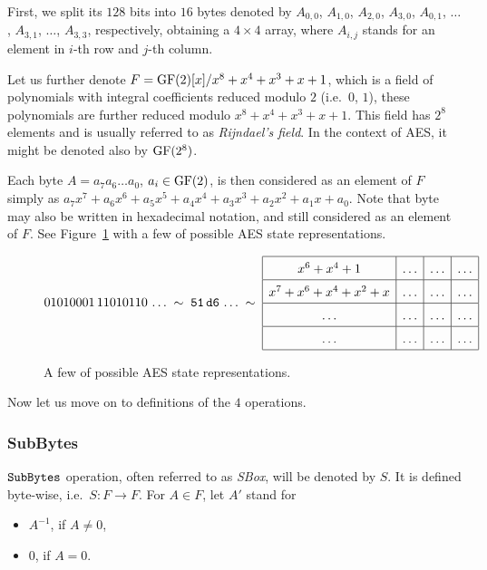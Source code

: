 First, we split its $128$ bits into $16$ bytes denoted by $A_{0,0}$, $A_{1,0}$, $A_{2,0}$, $A_{3,0}$, $A_{0,1}$, $\ldots$, $A_{3,1}$, $\ldots$, $A_{3,3}$, respectively, obtaining a $4\times 4$ array, where $A_{i,j}$ stands for an element in $i$-th row and $j$-th column.

Let us further denote $F = \mathrm{GF}(2)[x]/x^8+x^4+x^3+x+1$, which is a field of polynomials with integral coefficients reduced modulo $2$ (i.e.\ $0$, $1$), these polynomials are further reduced modulo $x^8+x^4+x^3+x+1$. This field has $2^8$ elements and is usually referred to as {\em Rijndael's field}. In the context of AES, it might be denoted also by $\mathrm{GF}(2^8)$.


Each byte $A = a_7a_6\ldots a_0$, $a_i\in\mathrm{GF}(2)$, is then considered as an element of $F$ simply as $a_7x^7 + a_6x^6 + a_5x^5 + a_4x^4 + a_3x^3 + a_2x^2 + a_1x + a_0$.  Note that byte may also be written in hexadecimal notation, and still considered as an element of $F$. See Figure~\ref{fig:aesnot} with a few of possible AES state representations.

\begin{figure}[H]
\[
\arraycolsep=.5em\def\arraystretch{1.5}
	01010001\,11010110\,\ldots\;\sim\;\texttt{51}\,\texttt{d6}\,\ldots\;\sim\;
	\begin{array}{|c|c|c|c|}
		\hline
		x^6 + x^4 + 1 & \ldots & \ldots & \ldots \\
		\hline
		x^7 + x^6 + x^4 + x^2 + x & \ldots & \ldots & \ldots \\
		\hline
		\ldots & \ldots & \ldots & \ldots \\
		\hline
		\ldots & \ldots & \ldots & \ldots \\
		\hline
	\end{array}
\]
\caption{A few of possible AES state representations.}
\label{fig:aesnot}
\end{figure}

\noindent
Now let us move on to definitions of the $4$ operations.

\subsubsection{SubBytes}
	
	$\texttt{SubBytes}$ operation, often referred to as {\em SBox}, will be denoted by $S$. It is defined byte-wise, i.e.\ $S: F \rightarrow F$. For $A\in F$, let $A'$ stand for
	\begin{itemize}
		\item $A^{-1}$, if $A \neq 0$,
		\item $0$, if $A = 0$.
	\end{itemize}
	
